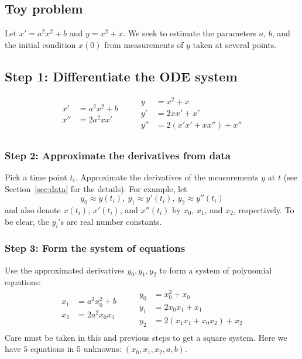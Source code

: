 \documentclass{ifacconf}
\begin{document}
	\subsection{Toy problem}
	Let $x' = a^2x^2 + b $ and $y = x^2+x$.  We seek to estimate the parameters $a$, $b$, and the initial condition $x(0)$ from measurements of $y$ taken at several points.  
	
	\subsection{Step 1: Differentiate  the ODE system}
    \[
    \begin{aligned}
         x' &= a^2x^2 + b\\
         x'' &= 2a^2x x'\\
    \end{aligned}
    \quad\quad
    \begin{aligned}
         y &= x^2 + x\\
         y' &= 2x x' + x'\\
         y'' &= 2(x'x' + x x'') + x''\\
    \end{aligned}
    \]

	\subsubsection{Step 2: Approximate the derivatives from data}
	Pick a time point $t_i$.  %
    Approximate the derivatives of the measurements $y$ at $t$ (see Section~\ref{sec:data} for the details).  For example, let \[y_0 \approx y(t_i),\ y_1 \approx y'(t_i),\ y_2 \approx y''(t_i)\] and also denote $x(t_i)$, $x'(t_i)$, and $x''(t_i)$ by $x_0$, $x_1$, and $x_2$, respectively. To be clear, the $y_i$'s are real number constants.
	
	\subsubsection{Step 3: Form the system of equations}
	Use the approximated derivatives $y_0, y_1, y_2$ to form a system of polynomial equations:
        \[
        \begin{aligned}
             x_1 &= a^2x_0^2 + b\\
             x_2 &= 2a^2x_0 x_1\\
        \end{aligned}
        \quad\quad
        \begin{aligned}
             y_0 &= x_0^2 + x_0\\
             y_1 &= 2x_0 x_1 + x_1\\
             y_2 &= 2(x_1x_1 + x_0 x_2) + x_2\\
        \end{aligned}
        \]
	Care must be taken in this and previous steps to get a square system.  Here we have $5$ equations in 5 unknowns: $(x_0, x_1, x_2, a, b).$
	
\end{document}
